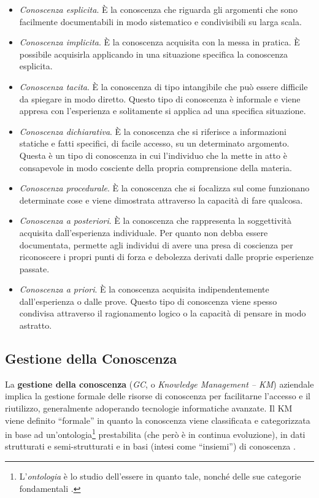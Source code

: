 \begin{itemize}
    \item \textit{Conoscenza esplicita}. È la conoscenza che riguarda gli argomenti che sono facilmente documentabili in modo sistematico e condivisibili su larga scala.
    \item \textit{Conoscenza implicita}. È la conoscenza acquisita con la messa in pratica. È possibile acquisirla applicando in una situazione specifica la conoscenza esplicita.
    \item \textit{Conoscenza tacita}. È la conoscenza di tipo intangibile che può essere difficile da spiegare in modo diretto. Questo tipo di conoscenza è informale e viene appresa con l’esperienza e solitamente si applica ad una specifica situazione. 
    \item \textit{Conoscenza dichiarativa}. È la conoscenza che si riferisce a informazioni statiche e fatti specifici, di facile accesso, su un determinato argomento. Questa è un tipo di conoscenza in cui l’individuo che la mette in atto è consapevole in modo cosciente della propria comprensione della materia.
    \item \textit{Conoscenza procedurale}. È la conoscenza che si focalizza sul come funzionano determinate cose e viene dimostrata attraverso la capacità di fare qualcosa.
    \item \textit{Conoscenza a posteriori}. È la conoscenza che rappresenta la soggettività acquisita dall'esperienza individuale. Per quanto non debba essere documentata, permette agli individui di avere una presa di coscienza per riconoscere i propri punti di forza e debolezza derivati dalle proprie esperienze passate.
    \item \textit{Conoscenza a priori}. È la conoscenza acquisita indipendentemente dall'esperienza o dalle prove. Questo tipo di conoscenza viene spesso condivisa attraverso il ragionamento logico o la capacità di pensare in modo astratto.
\end{itemize}

\subsection{Gestione della Conoscenza}

La \textbf{gestione della conoscenza} (\textit{GC}, o \textit{Knowledge Management – KM}) aziendale implica la gestione formale delle risorse di conoscenza per facilitarne l'accesso e il riutilizzo, generalmente adoperando tecnologie informatiche avanzate. Il KM viene definito ``formale'' in quanto la conoscenza viene classificata e categorizzata in base ad un'ontologia\footnote{L'\textit{ontologia} è lo studio dell'essere in quanto tale, nonché delle sue categorie fondamentali \cite{wikipedia_ontologia}.} prestabilita (che però è in continua evoluzione), in dati strutturati e semi-strutturati e in basi (intesi come ``insiemi'') di conoscenza \cite{overview_of_knowledge_management}.


